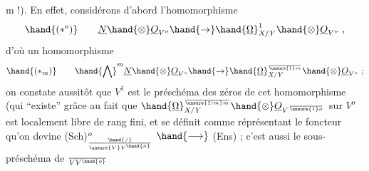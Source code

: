m !).  En effet, considérons d'abord  l'homomorphisme
\[ \hand{(*^o)} \qquad \underline{N}\hand{\otimes}\underline{O}_{V^o}\hand{\to}\hand{\underline{\Omega}}^1_{X/Y}\hand{\otimes}\underline{O}_{V^o} \ , \]
d'où  un homomorphisme
\[ \hand{(*_m)} \qquad \hand{\bigwedge}^m\underline{N}\hand{\otimes}\underline{O}_{V^o}\hand{\to}\hand{\underline{\Omega}}^{\over{\unsure{1}}{m}}_{X/Y}\hand{\otimes}\underline{O}_{V^o}\ ; \]
on constate aussitôt que $V^1$ est le préschéma des zéros de cet homomorphisme
(qui ``existe'' grâce au fait que $\hand{\underline{\Omega}}^{\over{\unsure{1|m}}{m}}_{X/Y}\hand{\otimes}\underline{O}_{V^{\over{\unsure{1}}{o}}}$  sur  $V^o$ est localement libre
de rang fini, et se définit comme réprésentant le foncteur qu'on devine
(Sch)$^o_{\hand{/}\over{\unsure{V}}{V}^{\hand{o}}}$ $\hand{\longrightarrow}$ (Ens) ; c'est aussi le sous-préschéma de $\over{V}{V}^{\hand{o}}$

